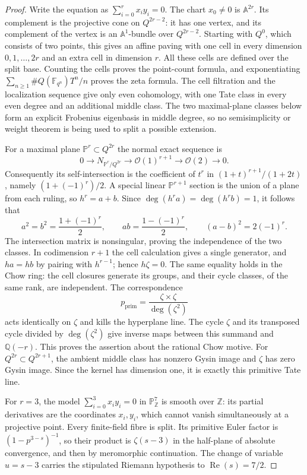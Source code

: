\documentclass[11pt,a4paper]{article}
\theoremstyle{remark}
\begin{document}
\begin{proof}
Write the equation as $\sum_{i=0}^r x_i y_i=0$. The chart $x_0\ne0$ is $\mathbb A^{2r}$. Its complement is the projective cone on $Q^{2r-2}$: it has one vertex, and its complement of the vertex is an $\mathbb A^1$-bundle over $Q^{2r-2}$. Starting with $Q^0$, which consists of two points, this gives an affine paving with one cell in every dimension $0,1,\ldots,2r$ and an extra cell in dimension $r$. All these cells are defined over the split base. Counting the cells proves the point-count formula, and exponentiating $\sum_{n\ge1}\#Q(\mathbb F_{q^n})T^n/n$ proves the zeta formula. The cell filtration and the localization sequence give only even cohomology, with one Tate class in every even degree and an additional middle class. The two maximal-plane classes below form an explicit Frobenius eigenbasis in middle degree, so no semisimplicity or weight theorem is being used to split a possible extension.

For a maximal plane $\mathbb P^r\subset Q^{2r}$ the normal exact sequence is
\[
 0\longrightarrow N_{\mathbb P^r/Q^{2r}}
 \longrightarrow\mathcal O(1)^{r+1}
 \longrightarrow\mathcal O(2)\longrightarrow0.
\]
Consequently its self-intersection is the coefficient of $t^r$ in
$(1+t)^{r+1}/(1+2t)$, namely $(1+(-1)^r)/2$. A special linear
$\mathbb P^{r+1}$ section is the union of a plane from each ruling, so
$h^r=a+b$. Since $\deg(h^r a)=\deg(h^r b)=1$, it follows that
\[
 a^2=b^2=\frac{1+(-1)^r}{2},\qquad
 ab=\frac{1-(-1)^r}{2},\qquad
 (a-b)^2=2(-1)^r.
\]
The intersection matrix is nonsingular, proving the independence of the two classes. In codimension $r+1$ the cell calculation gives a single generator, and $ha=hb$ by pairing with $h^{r-1}$; hence $h\zeta=0$. The same equality holds in the Chow ring: the cell closures generate its groups, and their cycle classes, of the same rank, are independent. The correspondence
\[
 p_{\mathrm{prim}}=\frac{\zeta\times\zeta}{\deg(\zeta^2)}
\]
acts identically on $\zeta$ and kills the hyperplane line. The cycle $\zeta$ and its transposed cycle divided by $\deg(\zeta^2)$ give inverse maps between this summand and $\mathbb Q(-r)$. This proves the assertion about the rational Chow motive. For $Q^{2r}\subset Q^{2r+1}$, the ambient middle class has nonzero Gysin image and $\zeta$ has zero Gysin image. Since the kernel has dimension one, it is exactly this primitive Tate line.

For $r=3$, the model $\sum_{i=0}^3x_i y_i=0$ in $\mathbb P^7_{\mathbb Z}$ is smooth over $\mathbb Z$: its partial derivatives are the coordinates $x_i,y_i$, which cannot vanish simultaneously at a projective point. Every finite-field fibre is split. Its primitive Euler factor is $(1-p^{3-s})^{-1}$, so their product is $\zeta(s-3)$ in the half-plane of absolute convergence, and then by meromorphic continuation. The change of variable $u=s-3$ carries the stipulated Riemann hypothesis to $\operatorname{Re}(s)=7/2$.
\end{proof}
\end{document}
